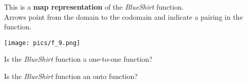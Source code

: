 \documentclass{ximera}
\author{Lee Wayand}
\begin{document}
\begin{exercise}


This is a \textbf{map representation} of the \textit{BlueShirt} function. \\

Arrows point from the domain to the codomain and indicate a pairing in the function.

\begin{image}
\texttt{[image: pics/f\_9.png]}
\end{image}


\begin{question}
Is the \textit{BlueShirt} function a one-to-one function?

\begin{multipleChoice}
\end{multipleChoice}
\end{question}






\begin{question}
Is the \textit{BlueShirt} function an onto function?

\begin{multipleChoice}
\end{multipleChoice}
\end{question}


\end{exercise}
\end{document}
